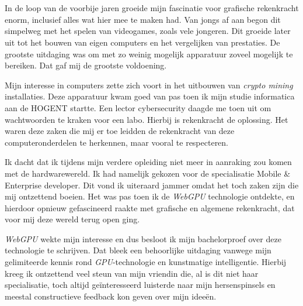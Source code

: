 
\chapter*{}%
\label{ch:voorwoord}


In de loop van de voorbije jaren groeide mijn fascinatie voor grafische rekenkracht enorm, inclusief alles wat hier mee te maken had. Van jongs af aan begon dit simpelweg met het spelen van videogames, zoals vele jongeren. Dit groeide later uit tot het bouwen van eigen computers en het vergelijken van prestaties. De grootste uitdaging was om met zo weinig mogelijk apparatuur zoveel mogelijk te bereiken. Dat gaf mij de grootste voldoening.

\bigbreak{}

Mijn interesse in computers zette zich voort in het uitbouwen van \textit{crypto mining} installaties. Deze apparatuur kwam goed van pas toen ik mijn studie informatica aan de HOGENT startte. Een lector cybersecurity daagde me toen uit om wachtwoorden te kraken voor een labo. Hierbij is rekenkracht de oplossing. Het waren deze zaken die mij er toe leidden de rekenkracht van deze com\-pu\-ter\-on\-der\-de\-len te herkennen, maar vooral te respecteren. 

\bigbreak{}

Ik dacht dat ik tijdens mijn verdere opleiding niet meer in aanraking zou komen met de hardwarewereld. Ik had namelijk gekozen voor de specialisatie Mobile \& Enterprise developer. Dit vond ik uiteraard jammer omdat het toch zaken zijn die mij ontzettend boeien. Het was pas toen ik de \textit{WebGPU} technologie ontdekte, en hierdoor opnieuw gefascineerd raakte met grafische en algemene rekenkracht, dat voor mij deze wereld terug open ging.

\bigbreak{}

\textit{WebGPU} wekte mijn interesse en dus besloot ik mijn bachelorproef over deze technologie te schrijven. Dat bleek een behoorlijke uitdaging vanwege mijn gelimiteerde kennis rond \textit{GPU}-technologie en kunstmatige intelligentie. Hierbij kreeg ik ontzettend veel steun van mijn vriendin die, al is dit niet haar specialisatie, toch altijd geïnteresseerd luisterde naar mijn hersenspinsels en meestal constructieve feedback kon geven over mijn ideeën.

